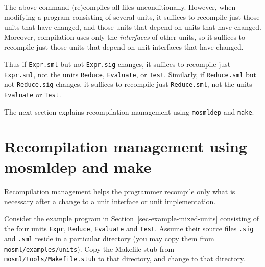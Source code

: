 \documentclass[fleqn,a4paper]{article}
\begin{document}
\noindent 
The above command (re)compiles all files unconditionally.  However,
when modifying a program consisting of several units, it suffices to
recompile just those units that have changed, and those units that
depend on units that have changed.  Moreover, compilation uses only
the \emph{interfaces} of other units, so it suffices to recompile just
those units that depend on unit interfaces that have changed.

Thus if \texttt{Expr.sml} but not \texttt{Expr.sig} changes, it
suffices to recompile just \texttt{Expr.sml}, not the units
\texttt{Reduce}, \texttt{Evaluate}, or \texttt{Test}\@.  Similarly, if
\texttt{Reduce.sml} but not \texttt{Reduce.sig} changes, it suffices
to recompile just \texttt{Reduce.sml}, not the units \texttt{Evaluate}
or \texttt{Test}\@.

The next section explains recompilation management using
\texttt{mosmldep} and \texttt{make}.


\newpage
\section{Recompilation management using mosmldep and make}
\label{sec-mixed-mode-recompilation}

Recompilation management helps the programmer recompile only what is
necessary after a change to a unit interface or unit implementation.  

Consider the example program in Section~\ref{sec-example-mixed-units}
consisting of the four units {\tt Expr}, {\tt Reduce}, {\tt Evaluate}
and {\tt Test}.  Assume their source files {\tt *.sig} and {\tt *.sml}
reside in a particular directory (you may copy them from
\texttt{mosml/examples/units}).  Copy the Makefile stub from
\texttt{mosml/tools/Makefile.stub} to that directory, and change to
that directory.
\end{document}
